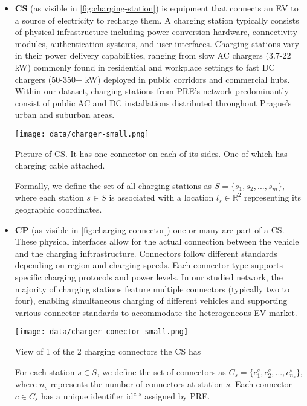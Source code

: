 \begin{itemize}
    \setlength\itemsep{1em}
    \item \textbf{\acrlong{CS}} (as visible in \ref{fig:charging-station}) is equipment that connects an \acrshort{EV} to a source of electricity to recharge them. A charging station typically consists of physical infrastructure including power conversion hardware, connectivity modules, authentication systems, and user interfaces. Charging stations vary in their power delivery capabilities, ranging from slow AC chargers (3.7-22 kW) commonly found in residential and workplace settings to fast DC chargers (50-350+ kW) deployed in public corridors and commercial hubs. Within our dataset, charging stations from PRE's network predominantly consist of public AC and DC installations distributed throughout Prague's urban and suburban areas.

          \begin{marginfigure}
              \centering
              \texttt{[image: data/charger-small.png]}
              \caption{Picture of \acrlong{CS}. It has one connector on each of its sides. One of which has charging cable attached.}
              \label{fig:charging-station}
          \end{marginfigure}
          \vspace{3.5mm}
          Formally, we define the set of all charging stations as $S = \{s_1, s_2, ..., s_m\}$, where each station $s \in S$ is associated with a location $l_s \in \mathbb{R}^2$ representing its geographic coordinates.

    \item  \textbf{\acrlong{CP}} (as visible in \ref{fig:charging-connector}) one or many are part of a \acrshort{CS}. These physical interfaces allow for the actual connection between the vehicle and the charging inftrastructure. Connectors follow different standards depending on region and charging speeds. Each connector type supports specific charging protocols and power levels. In our studied network, the majority of charging stations feature multiple connectors (typically two to four), enabling simultaneous charging of different vehicles and supporting various connector standards to accommodate the heterogeneous EV market.

          \begin{marginfigure}
              \centering
              \texttt{[image: data/charger-conector-small.png]}
              \caption{View of 1 of the 2 charging connectors the \acrshort{CS} has}
              \label{fig:charging-connector}
          \end{marginfigure}
          \vspace{3.5mm}
          For each station $s \in S$, we define the set of connectors as $C_s = \{c_1^s, c_2^s, ..., c_{n_s}^s\}$, where $n_s$ represents the number of connectors at station $s$. Each connector $c \in C_s$ has a unique identifier $\text{id}^{c,s}$ assigned by PRE.


\end{itemize}
